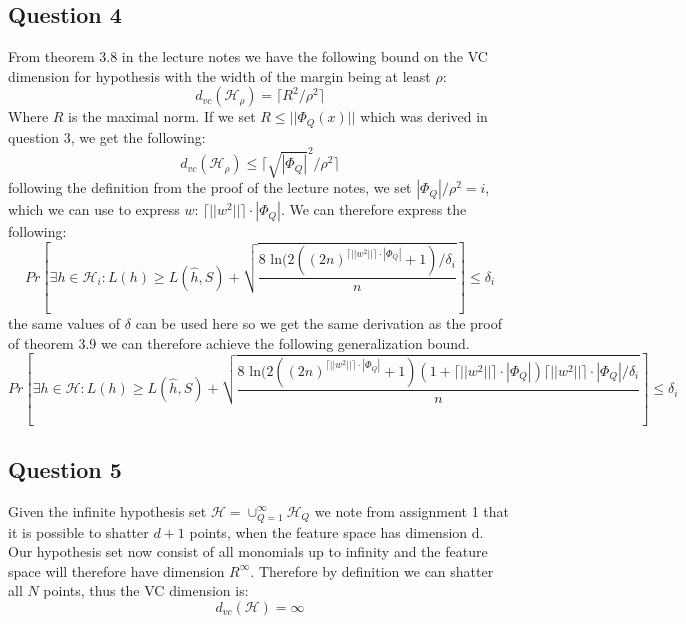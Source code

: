 \documentclass{article}
\begin{document}
\subsection{Question 4}
From theorem 3.8 in the lecture notes we have the following bound on the VC dimension for hypothesis with the width of the margin being at least $\rho$:
\begin{equation}
d_{vc}(\mathcal{H}_\rho) = \lceil R^2 / \rho^2 \rceil
\end{equation}
Where $R$ is the maximal norm. If we set $R \leq || \Phi_Q(x)||$ which was derived in question 3, we get the following:
\begin{equation}
d_{vc}(\mathcal{H}_\rho) \leq \lceil \sqrt{| \Phi_Q|}^2  / \rho^2 \rceil
\end{equation}
following the definition from the proof of the lecture notes, we set $
| \Phi_Q| / \rho^2 = i$, which we can use to express $w$: $\lceil || w^2|| \rceil \cdot| \Phi_Q|$. We can therefore express the following:
\begin{equation}
Pr \left[ \exists h \in \mathcal{H}_i: L(h) \geq L(\hat{h},S)+
\sqrt{ \dfrac{8 \text{ ln} (2((2n)^{\lceil || w^2|| \rceil \cdot| \Phi_Q|}+1) / \delta_i}{n}} \right] \leq \delta_i 
\end{equation}
the same values of $\delta$ can be used here so we get the same derivation as the proof of theorem 3.9 we can therefore achieve the following generalization bound.
\begin{equation}
Pr \left[ \exists h \in \mathcal{H}: L(h) \geq L(\hat{h},S)+
\sqrt{ \dfrac{8 \text{ ln} (2((2n)^{\lceil || w^2|| \rceil \cdot| \Phi_Q|}+1) (1+ \lceil || w^2|| \rceil \cdot| \Phi_Q|) \lceil || w^2|| \rceil \cdot| \Phi_Q|  / \delta_i}{n}} \right] \leq \delta_i 
\end{equation}
\subsection{Question 5}
Given the infinite hypothesis set $\mathcal{H} = \cup_{Q=1}^\infty \mathcal{H}_Q$ we note from assignment 1 that it is possible to shatter $d+1$ points, when the feature space has dimension d. Our hypothesis set now consist of all monomials  up to infinity and the feature space will therefore have dimension $R^\infty$. Therefore by definition we can shatter all $N$ points, thus the VC dimension is:
$$ d_{vc}(\mathcal{H}) = \infty $$
\end{document}
